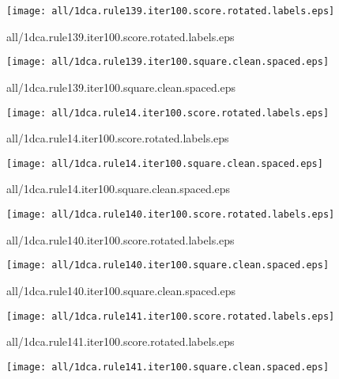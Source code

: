\documentclass{article}
\begin{document}
\begin{center}
\begin{minipage}{\textwidth}
\texttt{[image: all/1dca.rule139.iter100.score.rotated.labels.eps]}
\end{minipage}
\end{center}
{\footnotesize all/1dca.rule139.iter100.score.rotated.labels.eps}
\begin{center}
\begin{minipage}{\textwidth}
\texttt{[image: all/1dca.rule139.iter100.square.clean.spaced.eps]}
\end{minipage}
\end{center}
{\footnotesize all/1dca.rule139.iter100.square.clean.spaced.eps}
\begin{center}
\begin{minipage}{\textwidth}
\texttt{[image: all/1dca.rule14.iter100.score.rotated.labels.eps]}
\end{minipage}
\end{center}
{\footnotesize all/1dca.rule14.iter100.score.rotated.labels.eps}
\begin{center}
\begin{minipage}{\textwidth}
\texttt{[image: all/1dca.rule14.iter100.square.clean.spaced.eps]}
\end{minipage}
\end{center}
{\footnotesize all/1dca.rule14.iter100.square.clean.spaced.eps}
\begin{center}
\begin{minipage}{\textwidth}
\texttt{[image: all/1dca.rule140.iter100.score.rotated.labels.eps]}
\end{minipage}
\end{center}
{\footnotesize all/1dca.rule140.iter100.score.rotated.labels.eps}
\begin{center}
\begin{minipage}{\textwidth}
\texttt{[image: all/1dca.rule140.iter100.square.clean.spaced.eps]}
\end{minipage}
\end{center}
{\footnotesize all/1dca.rule140.iter100.square.clean.spaced.eps}
\begin{center}
\begin{minipage}{\textwidth}
\texttt{[image: all/1dca.rule141.iter100.score.rotated.labels.eps]}
\end{minipage}
\end{center}
{\footnotesize all/1dca.rule141.iter100.score.rotated.labels.eps}
\begin{center}
\begin{minipage}{\textwidth}
\texttt{[image: all/1dca.rule141.iter100.square.clean.spaced.eps]}
\end{minipage}
\end{center}
\end{document}
